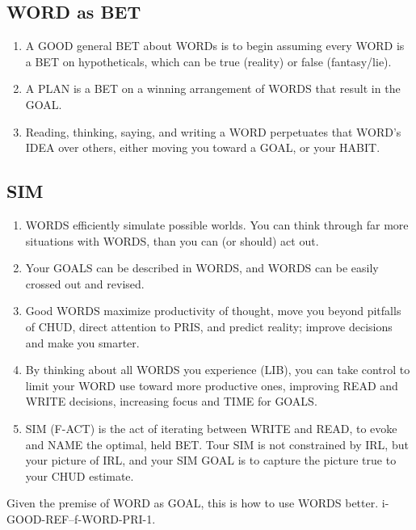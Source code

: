 \documentclass[
]{book}
\providecommand{\tightlist}{%
  \setlength{\itemsep}{0pt}\setlength{\parskip}{0pt}}
\begin{document}
\hypertarget{word-as-bet}{%
\subsection{WORD as BET}\label{word-as-bet}}

\begin{enumerate}
\def\labelenumi{\arabic{enumi}.}
\setcounter{enumi}{19}
\tightlist
\item
  A GOOD general BET about WORDs is to begin assuming every WORD is a BET on hypotheticals, which can be true (reality) or false (fantasy/lie).
\item
  A PLAN is a BET on a winning arrangement of WORDS that result in the GOAL.
\item
  Reading, thinking, saying, and writing a WORD perpetuates that WORD's IDEA over others, either moving you toward a GOAL, or your HABIT.
\end{enumerate}

\hypertarget{sim}{%
\subsection{SIM}\label{sim}}

\begin{enumerate}
\def\labelenumi{\arabic{enumi}.}
\setcounter{enumi}{22}
\tightlist
\item
  WORDS efficiently simulate possible worlds. You can think through far more situations with WORDS, than you can (or should) act out.
\item
  Your GOALS can be described in WORDS, and WORDS can be easily crossed out and revised.
\item
  Good WORDS maximize productivity of thought, move you beyond
  pitfalls of CHUD, direct attention to PRIS, and predict reality; improve decisions and make you smarter.
\item
  By thinking about all WORDS you experience (LIB), you can take control to limit your WORD use toward more productive ones,
  improving READ and WRITE decisions, increasing focus and TIME for GOALS.
\item
  SIM (F-ACT) is the act of iterating between WRITE and READ, to evoke and NAME the optimal, held BET. Tour SIM is not constrained by IRL, but your picture of IRL, and your SIM GOAL is to capture the picture true to your CHUD estimate.
\end{enumerate}

Given the premise of WORD as GOAL, this is how to use WORDS better.
i-GOOD-REF--f-WORD-PRI-1.
\end{document}
